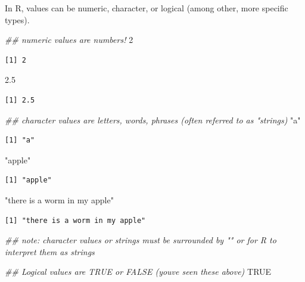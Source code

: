 \documentclass[
  letterpaper,
  DIV=11,
  numbers=noendperiod]{scrreprt}
\newenvironment{Shaded}{\begin{snugshade}}{\end{snugshade}}
\newcommand{\ConstantTok}[1]{\textcolor[rgb]{0.56,0.35,0.01}{#1}}
\newcommand{\DecValTok}[1]{\textcolor[rgb]{0.68,0.00,0.00}{#1}}
\newcommand{\DocumentationTok}[1]{\textcolor[rgb]{0.37,0.37,0.37}{\textit{#1}}}
\newcommand{\FloatTok}[1]{\textcolor[rgb]{0.68,0.00,0.00}{#1}}
\newcommand{\StringTok}[1]{\textcolor[rgb]{0.13,0.47,0.30}{#1}}
\begin{document}
In R, values can be numeric, character, or logical (among other, more
specific types).

\begin{Shaded}
\begin{Highlighting}[]
\DocumentationTok{\#\# numeric values are numbers!}
\DecValTok{2}
\end{Highlighting}
\end{Shaded}

\begin{verbatim}
[1] 2
\end{verbatim}

\begin{Shaded}
\begin{Highlighting}[]
\FloatTok{2.5}
\end{Highlighting}
\end{Shaded}

\begin{verbatim}
[1] 2.5
\end{verbatim}

\begin{Shaded}
\begin{Highlighting}[]
\DocumentationTok{\#\# character values are letters, words, phrases (often referred to as "strings)}
\StringTok{"a"}
\end{Highlighting}
\end{Shaded}

\begin{verbatim}
[1] "a"
\end{verbatim}

\begin{Shaded}
\begin{Highlighting}[]
\StringTok{"apple"}
\end{Highlighting}
\end{Shaded}

\begin{verbatim}
[1] "apple"
\end{verbatim}

\begin{Shaded}
\begin{Highlighting}[]
\StringTok{"there is a worm in my apple"}
\end{Highlighting}
\end{Shaded}

\begin{verbatim}
[1] "there is a worm in my apple"
\end{verbatim}

\begin{Shaded}
\begin{Highlighting}[]
\DocumentationTok{\#\# note: character values or strings must be surrounded by "" or \textquotesingle{}\textquotesingle{} for R to interpret them as strings}

\DocumentationTok{\#\# Logical values are TRUE or FALSE (you\textquotesingle{}ve seen these above)}
\ConstantTok{TRUE}
\end{Highlighting}
\end{Shaded}
\end{document}
